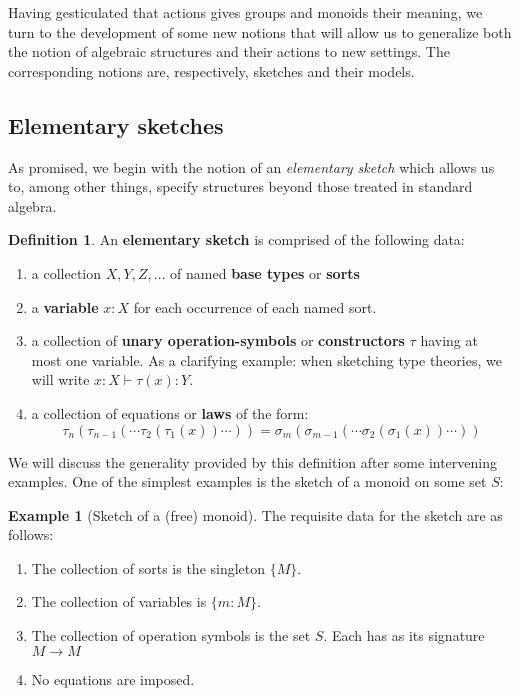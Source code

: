 \documentclass[12pt,twoside]{reedthesis}
\theoremstyle{definition}
\newtheorem{definition}{Definition}
\newtheorem{example}{Example}
\theoremstyle{remark}
\theoremstyle{theorem}
\begin{document}
Having gesticulated that actions gives groups and monoids their meaning, we turn
to the development of some new notions that will allow us to generalize both the
notion of algebraic structures and their actions to new
settings. %
The corresponding notions are, respectively, sketches and their models.

\subsection{Elementary sketches}
As promised, we begin with the notion of an \emph{elementary sketch} which
allows us to, among other things, specify structures beyond those treated in
standard algebra.
\begin{definition}
  An \textbf{elementary sketch} is comprised of the following data:
  \begin{enumerate}
    \item a collection \(X, Y, Z, \dots \) of named \textbf{base types} or
          \textbf{sorts}
    \item a \textbf{variable} \(x:X\) for each occurrence of each named sort.
    \item a collection of \textbf{unary operation-symbols} or
          \textbf{constructors} \(\tau\) having at most one variable. As a
          clarifying example: when sketching type theories, we will write
          \( x:X \vdash \tau(x) : Y \).
    \item a collection of equations or \textbf{laws} of the
          form: \[ \tau_n (\tau_{n-1}(\cdots \tau_2 (\tau_1 (x))\cdots )) = \sigma_m (\sigma_{m-1}(\cdots \sigma_2 (\sigma_1 (x))\cdots )) \]
  \end{enumerate}
\end{definition}
We will discuss the generality provided by this definition after some
intervening examples. One of the simplest examples is the sketch of a monoid on some set $S$:

\begin{example}[Sketch of a (free) monoid] The requisite data for the sketch are as follows:
  \begin{enumerate}
    \item The collection of sorts is the singleton \( \{M\} \).
    \item The collection of variables is \( \{m:M\} \).
    \item The collection of operation symbols is the set \( S \). Each has as its signature \( M \rightarrow M \)
    \item No equations are imposed.
  \end{enumerate}
\end{example}
\end{document}
